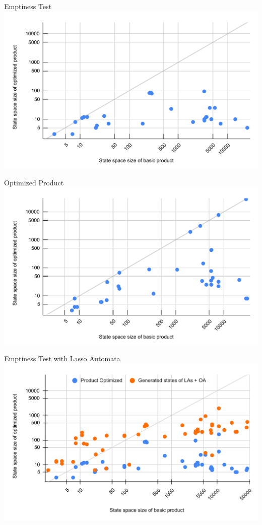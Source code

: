 \begin{frame}{Emptiness Test}
    \center\includegraphics[scale=0.5]{img/graph_et_scatter.pdf}
\end{frame}

\begin{frame}{Optimized Product}
    \center\includegraphics[scale=0.5]{img/graph_scatter_fp.pdf}
\end{frame}

\begin{frame}{Emptiness Test with Lasso Automata}
    \center\includegraphics[scale=0.5]{img/graph_scatter_combined_et_titles.pdf}
\end{frame}

